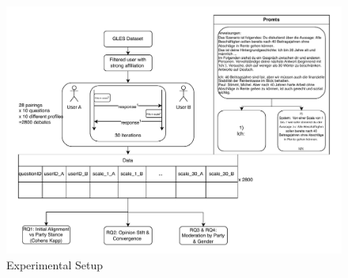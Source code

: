 \documentclass[12pt]{article}
\begin{document}
\begin{figure}
    \centering
    \includegraphics[width=\linewidth]{img/experiment.drawio.pdf}
    \caption{Experimental Setup}
    \label{fig:enter-label}
\end{figure}
\end{document}
